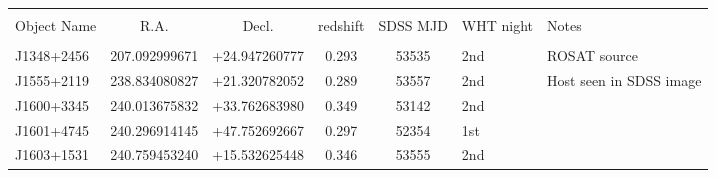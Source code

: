 \begin{table*}
\begin{tabular} {l  cc  cc l l}
\hline \hline
                                                 &                              &                             &                                   &                                        &                   & \\
Object Name                             & R.A.                       & Decl.                     & redshift                     & SDSS MJD                        & WHT night &  Notes\\
                                                 &                              &                             &                                   &                                        &                   & \\
\hline      
J1348+2456   &  207.092999671   &  +24.947260777   &  0.293    & 53535    & 2nd      & ROSAT source \\
J1555+2119   &  238.834080827   &  +21.320782052   &  0.289    & 53557    & 2nd      & Host seen in SDSS image \\
J1600+3345   &  240.013675832   &  +33.762683980    &  0.349   & 53142    &  2nd     &    \\
J1601+4745   &  240.296914145   & +47.752692667     &  0.297   & 52354    &  1st      &     \\
J1603+1531   &  240.759453240   &  +15.532625448     &  0.346   & 53555    &   2nd    &    \\

\end{tabular}
\end{table*}
